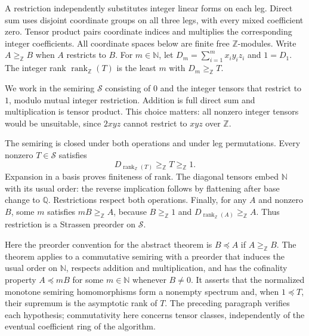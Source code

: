 \documentclass[11pt]{article}
\theoremstyle{remark}
\newcommand{\Z}{\mathbb Z}
\newcommand{\Q}{\mathbb Q}
\newcommand{\N}{\mathbb N}
\newcommand{\rk}{\operatorname{rank}_{\Z}}
\newcommand{\res}{\mathrel{\geq_{\Z}}}
\begin{document}
A restriction independently substitutes integer linear forms on each
leg. Direct sum uses disjoint coordinate groups on all three legs,
with every mixed coefficient zero. Tensor product pairs coordinate
indices and multiplies the corresponding integer coefficients.
All coordinate spaces below are finite free $\Z$-modules.
Write $A\res B$ when $A$ restricts to $B$. For $m\in\N$, let
$D_m=\sum_{i=1}^m x_i y_i z_i$ and $1=D_1$.
The integer rank $\rk(T)$ is the least $m$ with $D_m\res T$.

We work in the semiring $\mathcal S$ consisting of $0$ and the integer
tensors that restrict to $1$, modulo mutual integer restriction.
Addition is full direct sum and multiplication is tensor product.
This choice matters: all nonzero integer tensors would be unsuitable,
since $2xyz$ cannot restrict to $xyz$ over $\Z$.

The semiring is closed under both operations and under leg
permutations. Every nonzero $T\in\mathcal S$ satisfies
\[
 D_{\rk(T)}\res T\res1.
\]
Expansion in a basis proves finiteness of rank. The diagonal tensors
embed $\N$ with its usual order: the reverse implication follows by
flattening after base change to $\Q$. Restrictions respect both
operations. Finally, for any $A$ and nonzero $B$, some $m$ satisfies
$mB\res A$, because $B\res1$ and $D_{\rk(A)}\res A$.
Thus restriction is a Strassen preorder on $\mathcal S$.

Here the preorder convention for the abstract theorem is
$B\preceq A$ if $A\res B$. The theorem applies to a commutative
semiring with a preorder that induces the usual order on $\N$,
respects addition and multiplication, and has the cofinality property
$A\preceq mB$ for some $m\in\N$ whenever $B\ne0$.
It asserts that the normalized monotone semiring homomorphisms form a
nonempty spectrum and, when $1\preceq T$, their supremum is the
asymptotic rank of $T$. The preceding paragraph verifies each hypothesis;
commutativity here concerns tensor classes, independently of the eventual
coefficient ring of the algorithm.
\end{document}
